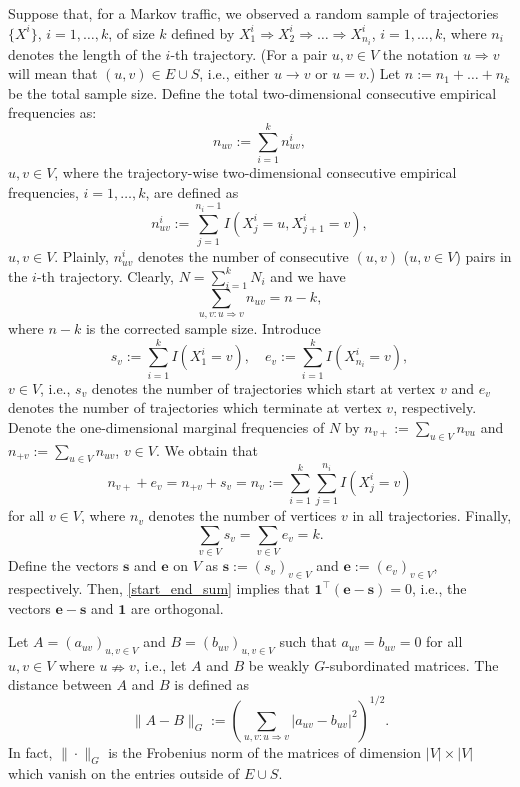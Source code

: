 \documentclass[b5paper,12pt]{report}
\theoremstyle{definition}
\newcommand{\be}{\boldsymbol{e}}
\newcommand{\bs}{\boldsymbol{s}}
\begin{document}
Suppose that, for a Markov traffic, we observed a random sample of trajectories  $\{X^i\}$, $i=1,\ldots,k$, of size $k$ defined by $X_1^i\Rightarrow X_2^i\Rightarrow\ldots\Rightarrow X_{n_i}^i$, $i=1,\ldots,k$, where $n_i$ denotes the length of the $i$-th trajectory. (For a pair $u,v\in V$ the notation $u\Rightarrow v$ will mean that $(u,v)\in E\cup S$, i.e., either $u\rightarrow v$ or $u=v$.) Let $n:=n_1+\ldots +n_k$ be the total sample size. Define the total two-dimensional consecutive empirical frequencies as:
\begin{equation}\label{2freq}
    n_{uv}:= \sum_{i=1}^k n_{uv}^i,
\end{equation}     
$u,v\in V$, where the trajectory-wise two-dimensional consecutive empirical frequencies, $i=1,\ldots,k$, are defined as
\[
    n_{uv}^i := \sum_{j=1}^{n_i-1} I(X_j^i=u,X_{j+1}^i=v),
\] 
$u,v\in V$. Plainly, $n_{uv}^i$ denotes the number of consecutive $(u,v)$ ($u,v\in V$) pairs in the $i$-th trajectory. Clearly, $N= \sum_{i=1}^k N_i$ and we have
\begin{equation}\label{corr_sample_size}
    \sum_{u,v:u\Rightarrow v} n_{uv} = n-k,
\end{equation}
where $n-k$ is the corrected sample size. Introduce
\[
    s_v := \sum_{i=1}^k I(X_1^i=v), \quad
          e_v := \sum_{i=1}^k I(X_{n_i}^i = v),
\] 
$v\in V$, i.e., $s_v$ denotes the number of trajectories which start at vertex $v$ and $e_v$ denotes the number of trajectories which terminate at vertex $v$, respectively. Denote the one-dimensional marginal frequencies of $N$ by $n_{v+}:=\sum_{u\in V} n_{vu}$ and $n_{+v}:=\sum_{u\in V} n_{uv}$, $v\in V$. We obtain that
\begin{equation}\label{start_end}
    n_{v+}+e_v = n_{+v} + s_v = n_v :=\sum_{i=1}^k \sum_{j=1}^{n_i} I(X_j^i=v)
\end{equation} 
for all $v\in V$, where $n_v$ denotes the number of vertices $v$ in all trajectories. Finally,
\begin{equation}\label{start_end_sum}        
    \sum_{v\in V}  s_v = \sum_{v\in V}  e_v = k.
\end{equation} 
Define the vectors $\bs$ and $\be$ on $V$ as $\bs:=(s_v)_{v\in V}$ and $\be:=(e_v)_{v\in V}$, respectively. Then, \eqref{start_end_sum} implies that $\textbf{1}^\top (\be -\bs) = 0$, i.e., the vectors $\be -\bs$ and $\textbf{1}$ are orthogonal.

Let $A=(a_{uv})_{u,v\in V}$ and $B=(b_{uv})_{u,v\in V}$ such that $a_{uv}=b_{uv}=0$ for all $u,v\in V$ where $u\nRightarrow v$, i.e., let $A$ and $B$ be weakly $G$-subordinated matrices. The distance between $A$ and $B$ is defined as 
\[
    \| A-B\|_G := \left(\sum_{u,v:u\Rightarrow v} |a_{uv} - b_{uv}|^2\right)^{1/2}.
\]
In fact,  $\| \cdot\|_G$ is the Frobenius norm of the matrices of dimension $|V|\times |V|$ which vanish on the entries outside of $E\cup S$.
\end{document}
